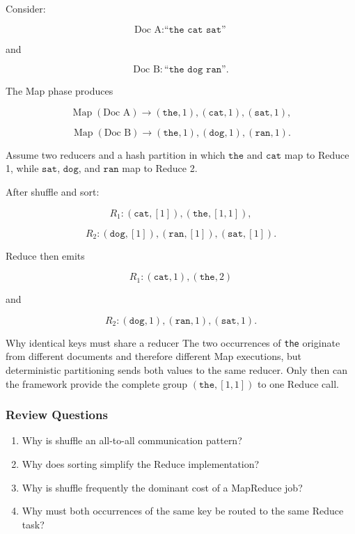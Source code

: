 \documentclass[11pt,a4paper,oneside]{book}
\begin{document}
Consider:

\[
\text{Doc A}: \texttt{``the cat sat''}
\]

and

\[
\text{Doc B}: \texttt{``the dog ran''}.
\]

The Map phase produces

\[
\operatorname{Map}(\text{Doc A})
\to
(\texttt{the},1),
(\texttt{cat},1),
(\texttt{sat},1),
\]

\[
\operatorname{Map}(\text{Doc B})
\to
(\texttt{the},1),
(\texttt{dog},1),
(\texttt{ran},1).
\]

Assume two reducers and a hash partition in which \(\texttt{the}\) and \(\texttt{cat}\) map to Reduce 1, while \(\texttt{sat}\), \(\texttt{dog}\), and \(\texttt{ran}\) map to Reduce 2.

After shuffle and sort:

\[
R_1:
(\texttt{cat},[1]),
(\texttt{the},[1,1]),
\]

\[
R_2:
(\texttt{dog},[1]),
(\texttt{ran},[1]),
(\texttt{sat},[1]).
\]

Reduce then emits

\[
R_1:
(\texttt{cat},1),
(\texttt{the},2)
\]

and

\[
R_2:
(\texttt{dog},1),
(\texttt{ran},1),
(\texttt{sat},1).
\]

\begin{examplebox}{Why identical keys must share a reducer}
The two occurrences of \texttt{the} originate from different documents and therefore different Map executions, but deterministic partitioning sends both values to the same reducer. Only then can the framework provide the complete group \((\texttt{the},[1,1])\) to one Reduce call.
\end{examplebox}

\subsubsection*{Review Questions}
\begin{enumerate}
    \item Why is shuffle an all-to-all communication pattern?
    \item Why does sorting simplify the Reduce implementation?
    \item Why is shuffle frequently the dominant cost of a MapReduce job?
    \item Why must both occurrences of the same key be routed to the same Reduce task?
\end{enumerate}
\end{document}
